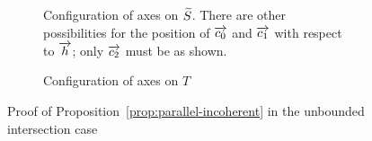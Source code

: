 \begin{figure}
  \begin{subfigure}[c]{0.45\textwidth}
    \centering
    \caption{Configuration of axes on $\widetilde{S}$. There are other
      possibilities for the position of
      $\overrightarrow{c_0}$ and $\overrightarrow{c_1}$ with respect to $\overrightarrow{h}$; only
      $\overrightarrow{c_2}$ must be as shown.}
    \label{fig:k_crossing_14}
  \end{subfigure}
  \hfill
  \begin{subfigure}[c]{0.45\textwidth}
    \centering
    \caption{Configuration of axes on $T$}
    \label{fig:tree_k_crossing_14}
  \end{subfigure}
  \caption{Proof of Proposition~\ref{prop:parallel-incoherent} in the
    unbounded intersection case}
  \label{fig:tree_bounded_incoherent}
\end{figure}

